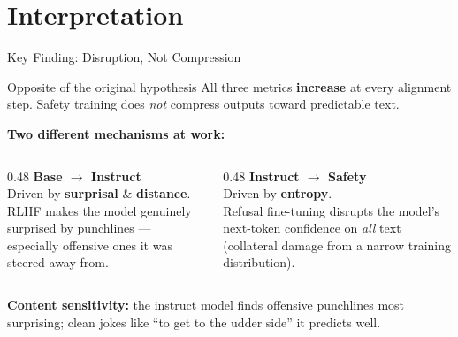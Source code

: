 \documentclass[aspectratio=169,10pt]{beamer}
\begin{document}
\section{Interpretation}

\begin{frame}{Key Finding: Disruption, Not Compression}
  \begin{alertblock}{Opposite of the original hypothesis}
    All three metrics \textbf{increase} at every alignment step.
    Safety training does \emph{not} compress outputs toward predictable text.
  \end{alertblock}

  \vspace{0.5em}
  \textbf{Two different mechanisms at work:}
  \begin{columns}[T]
    \begin{column}{0.48\textwidth}
      \textcolor{instructorange}{\textbf{Base $\to$ Instruct}}\\
      Driven by \textbf{surprisal} \& \textbf{distance}.\\
      RLHF makes the model genuinely surprised by punchlines --- especially
      offensive ones it was steered away from.
    \end{column}
    \begin{column}{0.48\textwidth}
      \textcolor{safetygreen}{\textbf{Instruct $\to$ Safety}}\\
      Driven by \textbf{entropy}.\\
      Refusal fine-tuning disrupts the model's next-token confidence
      on \emph{all} text (collateral damage from a narrow training distribution).
    \end{column}
  \end{columns}

  \vspace{0.5em}
  \textbf{Content sensitivity:} the instruct model finds offensive punchlines
  most surprising; clean jokes like ``to get to the udder side'' it predicts well.
\end{frame}
\end{document}
